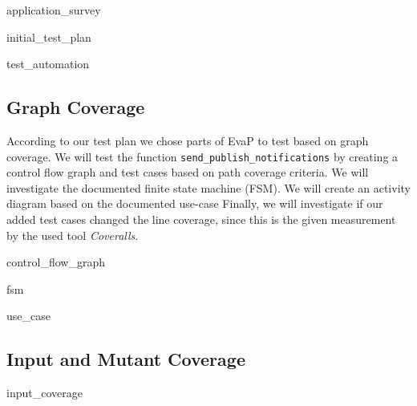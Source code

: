 {application_survey}

{initial_test_plan}

{test_automation}

\subsection{Graph Coverage}
\label{sec:graph-coverage}
According to our test plan we chose parts of EvaP to test based on graph coverage. 
We will test the function \texttt{send\_publish\_notifications} by creating a control flow graph and test cases based on path coverage criteria. 
We will investigate the documented finite state machine (FSM). 
We will create an activity diagram based on the documented use-case %
Finally, we will investigate if our added test cases changed the line coverage, since this is the given measurement by the used tool \textit{Coveralls}.

{control_flow_graph}

{fsm}

{use_case}

\subsection{Input and Mutant Coverage}
\label{sec:input-coverage}
{input_coverage}
